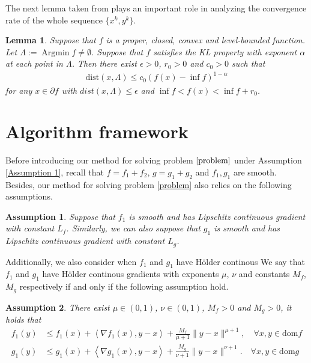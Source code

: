 \documentclass{article}
\numberwithin{equation}{section}
\newtheorem{lemma}{Lemma}[section]
\newtheorem{assumption}{Assumption}[section]
\def\Argmin{\mathop{\mathrm{Argmin}}}
\begin{document}
The next lemma taken from \cite[Lemma 3.10]{bolte2014proximal} plays an important role in analyzing the convergence rate of the whole sequence
$\{x^k,y^k\}$. 
\begin{lemma} \label{error_bound}
    Suppose that $f$ is a proper, closed, convex and level-bounded function. 
    Let $\Lambda := \Argmin f \neq \emptyset$. Suppose that $f$ satisfies the KL property with exponent $\alpha$ 
    at each point in $\Lambda$. Then there exist $\epsilon>0$, $r_0>0$ and $c_0>0$ such that
    \begin{align}
        \mathrm{dist}(x,\Lambda) \leq c_0 (f(x)-\inf f)^{1-\alpha} \nonumber
    \end{align}
    for any $x\in \partial f$ with $dist(x,\Lambda) \leq \epsilon$ and $\inf f <f(x) < \inf f+ r_0$.
\end{lemma}

\section{Algorithm framework }\label{section_convergence_Lipschitz} 
Before introducing our method for solving problem $\eqref{problem}$ under Assumption \ref{Assumption 1}, recall that $f=f_1 + f_2$, 
$g=g_1+g_2$ and  $f_1,g_1$ are smooth. 
Besides, our method for solving problem \eqref{problem} also relies on the following assumptions. 
\begin{assumption} \label{Assumption_Lipschitz_continuity}
    Suppose that $f_1$ is smooth and has Lipschitz continuous gradient with constant $L_f$. Similarly, 
    we can also suppose that $g_1$ is smooth and has Lipschitz continuous gradient with constant $L_g$.
\end{assumption}
Additionally,  we also consider when $f_1$ and $g_1$ have H\"older continous We say that $f_1$ and 
$g_1$ have H\"older continous gradients with exponents $\mu$, $\nu$ and constants $M_f$, $M_g$ respectively if and only if the following assumption hold.
\begin{assumption} \label{Assumption_holder}
   There exist $\mu \in (0,1)$, $\nu\in (0,1)$, $M_f>0$ and $M_g>0$,  it holds that 
    \begin{align}
        f_1(y) &\leq f_1(x) + \left\langle \nabla f_1(x), y-x \right\rangle +\frac{M_f}{\mu +1}
        \|y-x\rVert^{\mu +1},\quad \forall x,y\in \mathrm{dom}f \nonumber \\
        g_1(y) & \leq g_1(x) + \left\langle \nabla g_1(x), y-x \right\rangle +\frac{M_g}{\nu+1}
        \|y-x\rVert^{\nu+1}. \quad \forall x,y\in \mathrm{dom}g \label{Holder_property}
    \end{align}
\end{assumption}
\end{document}
